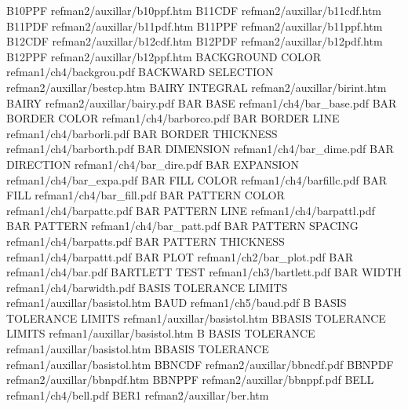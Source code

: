 B10PPF                                  refman2/auxillar/b10ppf.htm
B11CDF                                  refman2/auxillar/b11cdf.htm
B11PDF                                  refman2/auxillar/b11pdf.htm
B11PPF                                  refman2/auxillar/b11ppf.htm
B12CDF                                  refman2/auxillar/b12cdf.htm
B12PDF                                  refman2/auxillar/b12pdf.htm
B12PPF                                  refman2/auxillar/b12ppf.htm
BACKGROUND COLOR                        refman1/ch4/backgrou.pdf
BACKWARD SELECTION                      refman2/auxillar/bestcp.htm
BAIRY INTEGRAL                          refman2/auxillar/birint.htm
BAIRY                                   refman2/auxillar/bairy.pdf
BAR BASE                                refman1/ch4/bar_base.pdf
BAR BORDER COLOR                        refman1/ch4/barborco.pdf
BAR BORDER LINE                         refman1/ch4/barborli.pdf
BAR BORDER THICKNESS                    refman1/ch4/barborth.pdf
BAR DIMENSION                           refman1/ch4/bar_dime.pdf
BAR DIRECTION                           refman1/ch4/bar_dire.pdf
BAR EXPANSION                           refman1/ch4/bar_expa.pdf
BAR FILL COLOR                          refman1/ch4/barfillc.pdf
BAR FILL                                refman1/ch4/bar_fill.pdf
BAR PATTERN COLOR                       refman1/ch4/barpattc.pdf
BAR PATTERN LINE                        refman1/ch4/barpattl.pdf
BAR PATTERN                             refman1/ch4/bar_patt.pdf
BAR PATTERN SPACING                     refman1/ch4/barpatts.pdf
BAR PATTERN THICKNESS                   refman1/ch4/barpattt.pdf
BAR PLOT                                refman1/ch2/bar_plot.pdf
BAR                                     refman1/ch4/bar.pdf
BARTLETT TEST                           refman1/ch3/bartlett.pdf
BAR WIDTH                               refman1/ch4/barwidth.pdf
BASIS TOLERANCE LIMITS                  refman1/auxillar/basistol.htm
BAUD                                    refman1/ch5/baud.pdf
B BASIS TOLERANCE LIMITS                refman1/auxillar/basistol.htm
BBASIS TOLERANCE LIMITS                 refman1/auxillar/basistol.htm
B BASIS TOLERANCE                       refman1/auxillar/basistol.htm
BBASIS TOLERANCE                        refman1/auxillar/basistol.htm
BBNCDF                                  refman2/auxillar/bbncdf.pdf
BBNPDF                                  refman2/auxillar/bbnpdf.htm
BBNPPF                                  refman2/auxillar/bbnppf.pdf
BELL                                    refman1/ch4/bell.pdf
BER1                                    refman2/auxillar/ber.htm

